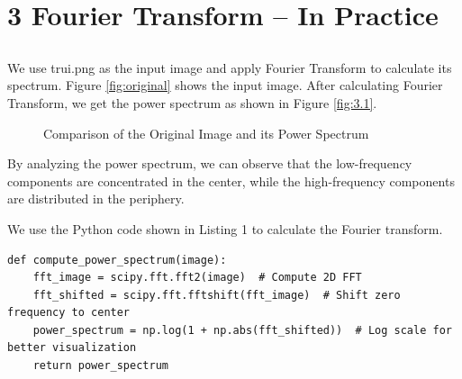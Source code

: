 \documentclass[12pt]{article}
\begin{document}
\section{3 Fourier Transform – In Practice}
\subsection{}
We use trui.png as the input image and apply Fourier Transform to calculate its spectrum. Figure \ref{fig:original} shows the input image. After calculating Fourier Transform, we get the power spectrum as shown in Figure \ref{fig:3.1}.

\begin{figure}[ht]
    \centering
    \hfill
    \caption{Comparison of the Original Image and its Power Spectrum}
    \label{fig:comparison}
\end{figure}


By analyzing the power spectrum, we can observe that the low-frequency components are concentrated in the center, while the high-frequency components are distributed in the periphery.

We use the Python code shown in Listing 1 to calculate the Fourier transform.
\begin{lstlisting}[caption={Compute Power Spectrum Using 2D Fourier Transform},captionpos=b]
def compute_power_spectrum(image):
    fft_image = scipy.fft.fft2(image)  # Compute 2D FFT
    fft_shifted = scipy.fft.fftshift(fft_image)  # Shift zero frequency to center
    power_spectrum = np.log(1 + np.abs(fft_shifted))  # Log scale for better visualization
    return power_spectrum
\end{lstlisting}
\end{document}

